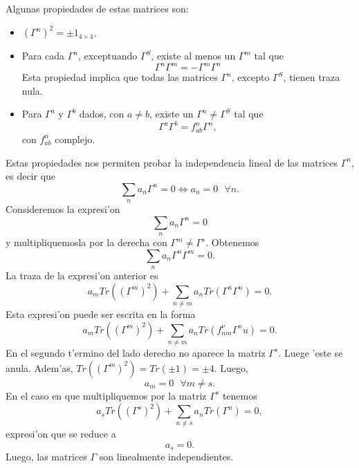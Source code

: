 Algunas propiedades de estas matrices son:

\begin{itemize}
\item $(\Gamma^n)^2=\pm 1_{4\times 4}$.
\item Para cada $\Gamma^n$, exceptuando $\Gamma^S$, existe al menos un
$\Gamma^m$ tal que
\begin{equation}
\Gamma^n\Gamma^m=-\Gamma^m\Gamma^n
\end{equation}
Esta propiedad implica que todas las matrices $\Gamma^n$, excepto $\Gamma^S$,
tienen traza nula.
\item Para $\Gamma^a$ y $\Gamma^b$ dados, con $a\ne b$, existe un
$\Gamma^n\ne\Gamma^S$ tal que
\begin{equation}
\Gamma^a\Gamma^b=f_{ab}^n\Gamma^n,
\end{equation}
con $f_{ab}^n$ complejo.
\end{itemize}
Estas propiedades nos permiten probar la independencia lineal de las matrices
$\Gamma^n$, es decir que
\begin{equation}
\sum_n a_n\Gamma^n=0\iff a_n=0~~~\forall n.
\end{equation}
Consideremos la expresi'on
\begin{equation}
\sum_n a_n\Gamma^n=0
\end{equation}
y multipliquemosla por la derecha con $\Gamma^m\ne\Gamma^s$. Obtenemos
\begin{equation}
\sum_n a_n\Gamma^n\Gamma^m=0.
\end{equation}
La traza de la expresi'on anterior es
\begin{equation}
a_mTr((\Gamma^m)^2)+\sum_{n\ne m} a_nTr(\Gamma^n\Gamma^n)=0.
\end{equation}
Esta expresi'on puede ser escrita en la forma
\begin{equation}
a_mTr((\Gamma^m)^2)+\sum_{n\ne m} a_nTr(f_{nm}^\nu\Gamma^nu)=0.
\end{equation}
En el segundo t'ermino del lado derecho no aparece la matriz $\Gamma^s$. Luege
'este se anula. Adem'as, $Tr((\Gamma^m)^2)=Tr(\pm 1)=\pm4$. Luego,
\begin{equation}
a_m=0~~~\forall m\ne s.
\end{equation}
En el caso en que multipliquemos por la matriz $\Gamma^s$ tenemos
\begin{equation}
a_sTr((\Gamma^s)^2)+\sum_{n\ne s} a_nTr(\Gamma^n)=0,
\end{equation}
expresi'on que se reduce a
\begin{equation}
a_s=0.
\end{equation}
Luego, las matrices $\Gamma$ son linealmente independientes.

